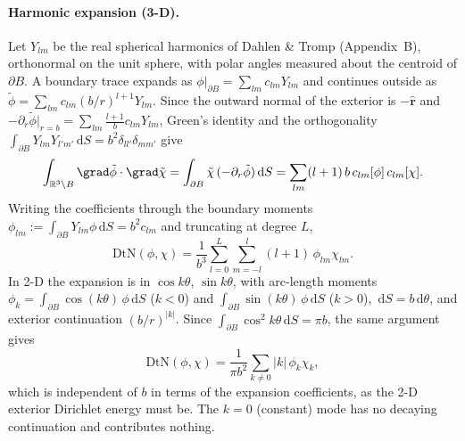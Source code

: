 \documentclass[11pt]{article}
\numberwithin{equation}{section}
\theoremstyle{remark}
\newcommand{\R}{\mathbb{R}}
\newcommand{\dS}{\,\mathrm{d}S}
\newcommand{\DtN}{\mathrm{DtN}}
\begin{document}
\paragraph{Harmonic expansion (3-D).} Let $Y_{lm}$ be the real spherical
harmonics of Dahlen \& Tromp \cite{DahlenTromp1998} (Appendix~B),
orthonormal on the unit sphere, with polar angles measured about the
centroid of $\partial B$. A boundary trace expands as $\phi|_{\partial B}
= \sum_{lm}c_{lm}Y_{lm}$ and continues outside as $\tilde\phi =
\sum_{lm}c_{lm}(b/r)^{l+1}Y_{lm}$. Since the outward normal of the exterior
is $-\hat{\mathbf{r}}$ and $-\partial_r\tilde\phi|_{r=b} =
\sum_{lm}\frac{l+1}{b}c_{lm}Y_{lm}$, Green's identity and the orthogonality
$\int_{\partial B}Y_{lm}Y_{l'm'}\dS = b^2\delta_{ll'}\delta_{mm'}$ give
\[
  \int_{\R^3\setminus B}\grad\tilde\phi\cdot\grad\tilde\chi
  = \int_{\partial B}\tilde\chi\,(-\partial_r\tilde\phi)\dS
  = \sum_{lm}(l+1)\,b\,c_{lm}[\phi]\,c_{lm}[\chi].
\]
Writing the coefficients through the boundary moments
$\phi_{lm} := \int_{\partial B}Y_{lm}\phi\dS = b^2c_{lm}$ and truncating at
degree $L$,
\begin{equation}
  \DtN(\phi,\chi) = \frac{1}{b^3}\sum_{l=0}^{L}\sum_{m=-l}^{l}(l+1)\,
     \phi_{lm}\chi_{lm}.
  \label{eq:dtn3}
\end{equation}
In 2-D the expansion is in $\cos k\theta$, $\sin k\theta$, with
arc-length moments $\phi_k = \int_{\partial B}\cos(k\theta)\,\phi\dS$
($k<0$) and $\int_{\partial B}\sin(k\theta)\,\phi\dS$ ($k>0$), $\dS =
b\,\mathrm{d}\theta$, and exterior continuation $(b/r)^{|k|}$. Since
$\int_{\partial B}\cos^2k\theta\dS = \pi b$, the same argument gives
\begin{equation}
  \DtN(\phi,\chi) = \frac{1}{\pi b^2}\sum_{k\neq0}|k|\,\phi_k\chi_k ,
\end{equation}
which is independent of $b$ in terms of the expansion coefficients, as the
2-D exterior Dirichlet energy must be. The $k = 0$ (constant) mode has no
decaying continuation and contributes nothing.
\end{document}

